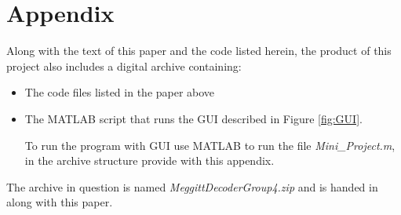 \documentclass[Appendix]{subfiles}
\begin{document}
\chapter{Appendix}
Along with the text of this paper and the code listed herein, the product of this project also includes a digital archive containing:

\begin{itemize}
\item
The code files listed in the paper above

\item
The MATLAB script that runs the GUI described in Figure \ref{fig:GUI}.

	\subitem
	To run the program with GUI use MATLAB to run the file \textit{Mini\_Project.m}, in the archive structure provide with this appendix.

\end{itemize}

The archive in question is named \textit{MeggittDecoderGroup4.zip} and is handed in along with this paper.
\end{document}
